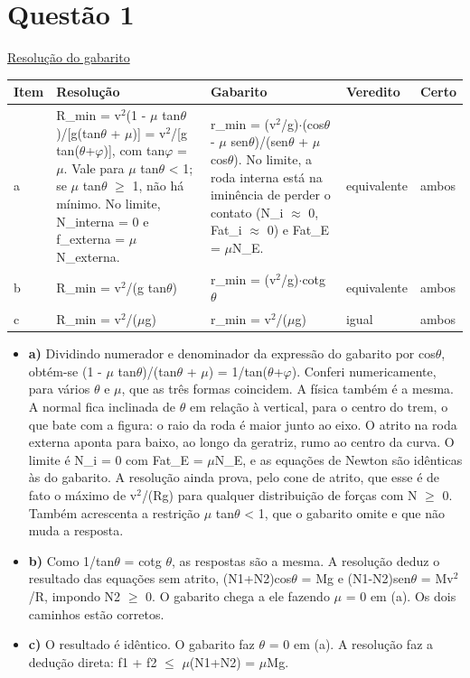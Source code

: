 \documentclass{article}%
\begin{document}
\section*{Questão 1}%
\href{https://poliedroresolve.sistemapoliedro.com.br/vestibulares/ita/2026/ita-2-fase-dia-3-30-10-2025-2-fase-dia-3/dissertativa-1-fisica-2-fase-dia-3-ita-2026}{Resolução do gabarito}\par\smallskip%
\begin{longtable}{@{}p{} p{} p{} p{} p{}@{}}\toprule Item & Resolução & Gabarito & Veredito & Certo \\ \midrule
a & R\_min = v$^2$(1 - $\mu$ tan$\theta$)/{[}g(tan$\theta$ + $\mu$){]} = v$^2$/{[}g tan($\theta$+$\varphi$){]}, com tan$\varphi$ = $\mu$. Vale para $\mu$ tan$\theta$ < 1; se $\mu$ tan$\theta$ $\geq$ 1, não há mínimo. No limite, N\_interna = 0 e f\_externa = $\mu$N\_externa. & r\_min = (v$^2$/g)$\cdot$(cos$\theta$ - $\mu$ sen$\theta$)/(sen$\theta$ + $\mu$ cos$\theta$). No limite, a roda interna está na iminência de perder o contato (N\_i $\approx$ 0, Fat\_i $\approx$ 0) e Fat\_E = $\mu$N\_E. & equivalente & ambos \\
b & R\_min = v$^2$/(g tan$\theta$) & r\_min = (v$^2$/g)$\cdot$cotg $\theta$ & equivalente & ambos \\
c & R\_min = v$^2$/($\mu$g) & r\_min = v$^2$/($\mu$g) & igual & ambos \\
\bottomrule\end{longtable}%
\begin{itemize}%
\item%
\textbf{a)} Dividindo numerador e denominador da expressão do gabarito por cos$\theta$, obtém{-}se (1 - $\mu$ tan$\theta$)/(tan$\theta$ + $\mu$) = 1/tan($\theta$+$\varphi$). Conferi numericamente, para vários $\theta$ e $\mu$, que as três formas coincidem. A física também é a mesma. A normal fica inclinada de $\theta$ em relação à vertical, para o centro do trem, o que bate com a figura: o raio da roda é maior junto ao eixo. O atrito na roda externa aponta para baixo, ao longo da geratriz, rumo ao centro da curva. O limite é N\_i = 0 com Fat\_E = $\mu$N\_E, e as equações de Newton são idênticas às do gabarito. A resolução ainda prova, pelo cone de atrito, que esse é de fato o máximo de v$^2$/(Rg) para qualquer distribuição de forças com N $\geq$ 0. Também acrescenta a restrição $\mu$ tan$\theta$ < 1, que o gabarito omite e que não muda a resposta.%
\item%
\textbf{b)} Como 1/tan$\theta$ = cotg $\theta$, as respostas são a mesma. A resolução deduz o resultado das equações sem atrito, (N1+N2)cos$\theta$ = Mg e (N1-N2)sen$\theta$ = Mv$^2$/R, impondo N2 $\geq$ 0. O gabarito chega a ele fazendo $\mu$ = 0 em (a). Os dois caminhos estão corretos.%
\item%
\textbf{c)} O resultado é idêntico. O gabarito faz $\theta$ = 0 em (a). A resolução faz a dedução direta: f1 + f2 $\leq$ $\mu$(N1+N2) = $\mu$Mg.%
\end{itemize}%
\end{document}
